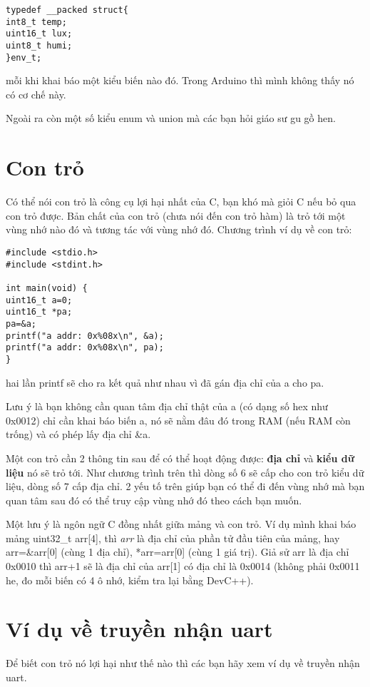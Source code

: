 \begin{lstlisting}
typedef __packed struct{
int8_t temp;
uint16_t lux;
uint8_t humi;
}env_t;
\end{lstlisting}
mỗi khi khai báo một kiểu biến nào đó. Trong Arduino thì mình không thấy nó có cơ chế này.


Ngoài ra còn một số kiểu enum và union mà các bạn hỏi giáo sư gu gồ hen.

\section{Con trỏ}

Có thể nói con trỏ là công cụ lợi hại nhất của C, bạn khó mà giỏi C nếu bỏ qua con trỏ được. Bản chất của con trỏ (chưa nói đến con trỏ hàm) là trỏ tới một vùng nhớ nào đó và tương tác với vùng nhớ đó. Chương trình ví dụ về con trỏ:
\begin{lstlisting}
#include <stdio.h>
#include <stdint.h>

int main(void) {
uint16_t a=0;
uint16_t *pa;
pa=&a;
printf("a addr: 0x%08x\n", &a);
printf("a addr: 0x%08x\n", pa);
}
\end{lstlisting}

hai lần printf sẽ cho ra kết quả như nhau vì đã gán địa chỉ của a cho pa.

Lưu ý là bạn không cần quan tâm địa chỉ thật của a (có dạng số hex như 0x0012) chỉ cần khai báo biến a, nó sẽ nằm đâu đó trong RAM (nếu RAM còn trống) và có phép lấy địa chỉ \&a.

Một con trỏ cần 2 thông tin sau để có thể hoạt động được: \textbf{địa chỉ} và \textbf{kiểu dữ liệu} nó sẽ trỏ tới. Như chương trình trên thì dòng số 6 sẽ cấp cho con trỏ kiểu dữ liệu, dòng số 7 cấp địa chỉ. 2 yếu tố trên giúp bạn có thể đi đến vùng nhớ mà bạn quan tâm sau đó có thể truy cập vùng nhớ đó theo cách bạn muốn.

Một lưu ý là ngôn ngữ C đồng nhất giữa mảng và con trỏ. Ví dụ mình khai báo mảng uint32\_t arr[4], thì \textit{arr} là địa chỉ của phần tử đầu tiên của mảng, hay arr=\&arr[0] (cùng 1 địa chỉ), *arr=arr[0] (cùng 1 giá trị). Giả sử arr là địa chỉ 0x0010 thì arr+1 sẽ là địa chỉ của arr[1] có địa chỉ là 0x0014 (không phải 0x0011 he, đo mỗi biến có 4 ô nhớ, kiểm tra lại bằng DevC++).
\section{Ví dụ về truyền nhận uart}


Để biết con trỏ nó lợi hại như thế nào thì các bạn hãy xem ví dụ về truyền nhận uart.

